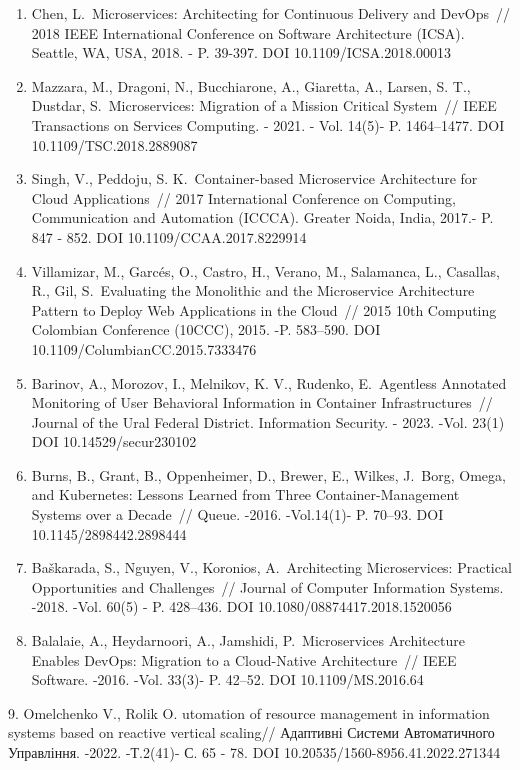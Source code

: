 \documentclass[
]{article}
\begin{document}
\begin{enumerate}
\def\labelenumi{\arabic{enumi}.}
\item
  Chen, L.~Microservices: Architecting for Continuous Delivery and
  DevOps~// 2018 IEEE International Conference on Software Architecture
  (ICSA). Seattle, WA, USA, 2018. - P. 39-397. DOI
  10.1109/ICSA.2018.00013
\item
  Mazzara, M., Dragoni, N., Bucchiarone, A., Giaretta, A., Larsen, S.
  T., Dustdar, S.~Microservices: Migration of a Mission Critical
  System~// IEEE Transactions on Services Computing. - 2021. - Vol.
  14(5)- P. 1464--1477. DOI 10.1109/TSC.2018.2889087
\item
  Singh, V., Peddoju, S. K.~Container-based Microservice Architecture
  for Cloud Applications~// 2017 International Conference on Computing,
  Communication and Automation (ICCCA). Greater Noida, India, 2017.- P.
  847 - 852. DOI 10.1109/CCAA.2017.8229914
\item
  Villamizar, M., Garcés, O., Castro, H., Verano, M., Salamanca, L.,
  Casallas, R., Gil, S.~Evaluating the Monolithic and the Microservice
  Architecture Pattern to Deploy Web Applications in the Cloud~// 2015
  10th Computing Colombian Conference (10CCC), 2015. -P. 583--590. DOI
  10.1109/ColumbianCC.2015.7333476
\item
  Barinov, A., Morozov, I., Melnikov, K. V., Rudenko, E.~Agentless
  Annotated Monitoring of User Behavioral Information in Container
  Infrastructures~// Journal of the Ural Federal District. Information
  Security. - 2023. -Vol. 23(1) DOI 10.14529/secur230102
\item
  Burns, B., Grant, B., Oppenheimer, D., Brewer, E., Wilkes, J.~Borg,
  Omega, and Kubernetes: Lessons Learned from Three Container-Management
  Systems over a Decade~// Queue. -2016. -Vol.14(1)- P. 70--93. DOI
  10.1145/2898442.2898444
\item
  Baškarada, S., Nguyen, V., Koronios, A.~Architecting Microservices:
  Practical Opportunities and Challenges~// Journal of Computer
  Information Systems. -2018. -Vol. 60(5) - P. 428--436. DOI
  10.1080/08874417.2018.1520056
\item
  Balalaie, A., Heydarnoori, A., Jamshidi, P.~Microservices Architecture
  Enables DevOps: Migration to a Cloud-Native Architecture~// IEEE
  Software. -2016. -Vol. 33(3)- P. 42--52. DOI 10.1109/MS.2016.64
\end{enumerate}

9. Omelchenko V., Rolik O. utomation of resource management in
information systems based on reactive vertical scaling// Адаптивні
Системи Автоматичного Управління. -2022. -Т.2(41)- С. 65 - 78. DOI
10.20535/1560-8956.41.2022.271344
\end{document}
